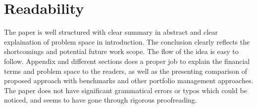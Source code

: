 \documentclass[twoside,11pt]{article}
\begin{document}
\section{Readability}

The paper is well structured with clear summary in abstract and clear explaination of problem space in introduction. The conclusion clearly reflects the shortcomings and potential future work scope. The flow of the idea is easy to follow. Appendix and different sections does a proper job to explain the financial terms and problem space to the readers, as well as the presenting comparison of proposed approach with benchmarks and other portfolio management approaches. The paper does not have significant grammatical errors or typos which could be noticed, and seems to have gone through rigorous proofreading. 

\vskip 0.2in

\end{document}
